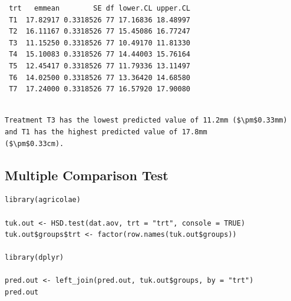 \documentclass[a4paper, 10pt, fleqn, twosided]{memoir}
\begin{document}
\begin{tcolorbox}[title = Example 2 Predicted output]
\begin{verbatim}
 trt   emmean        SE df lower.CL upper.CL
 T1  17.82917 0.3318526 77 17.16836 18.48997
 T2  16.11167 0.3318526 77 15.45086 16.77247
 T3  11.15250 0.3318526 77 10.49170 11.81330
 T4  15.10083 0.3318526 77 14.44003 15.76164
 T5  12.45417 0.3318526 77 11.79336 13.11497
 T6  14.02500 0.3318526 77 13.36420 14.68580
 T7  17.24000 0.3318526 77 16.57920 17.90080
\end{verbatim}
\end{tcolorbox}

\begin{tcolorbox}[title = Example 2 Prediction interpretation]
\begin{lstlisting}

Treatment T3 has the lowest predicted value of 11.2mm ($\pm$0.33mm)
and T1 has the highest predicted value of 17.8mm
($\pm$0.33cm).
\end{lstlisting}
\end{tcolorbox}


\subsection{Multiple Comparison Test}

\begin{tcolorbox}[title = Example 2 Tukey's multiple comparison]
\begin{verbatim}
library(agricolae)

tuk.out <- HSD.test(dat.aov, trt = "trt", console = TRUE)
tuk.out$groups$trt <- factor(row.names(tuk.out$groups))

library(dplyr)

pred.out <- left_join(pred.out, tuk.out$groups, by = "trt")
pred.out
\end{verbatim}
\end{tcolorbox}
\clearpage
\end{document}
